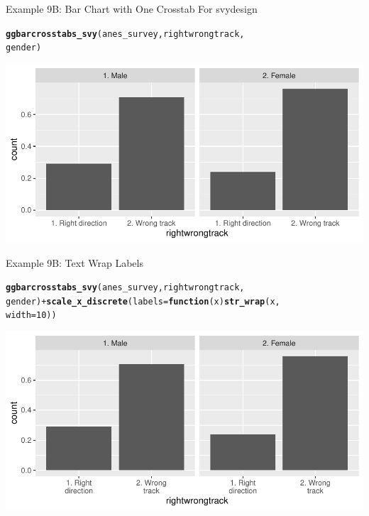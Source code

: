 \documentclass{beamer}\usepackage[]{graphicx}\usepackage[]{color}
\makeatletter
\newcommand{\hlnum}[1]{\textcolor[rgb]{0.686,0.059,0.569}{#1}}%
\newcommand{\hlopt}[1]{\textcolor[rgb]{0,0,0}{#1}}%
\newcommand{\hlstd}[1]{\textcolor[rgb]{0.345,0.345,0.345}{#1}}%
\newcommand{\hlkwa}[1]{\textcolor[rgb]{0.161,0.373,0.58}{\textbf{#1}}}%
\newcommand{\hlkwc}[1]{\textcolor[rgb]{0.333,0.667,0.333}{#1}}%
\newcommand{\hlkwd}[1]{\textcolor[rgb]{0.737,0.353,0.396}{\textbf{#1}}}%
\newenvironment{kframe}{%
 \def\at@end@of@kframe{}%
 \ifinner\ifhmode%
  \def\at@end@of@kframe{\end{minipage}}%
  \begin{minipage}{\columnwidth}%
 \fi\fi%
 \def\FrameCommand##1{\hskip\@totalleftmargin \hskip-\fboxsep
 \colorbox{shadecolor}{##1}\hskip-\fboxsep
     \hskip-\linewidth \hskip-\@totalleftmargin \hskip\columnwidth}%
 \MakeFramed {\advance\hsize-\width
   \@totalleftmargin\z@ \linewidth\hsize
   \@setminipage}}%
 {\par\unskip\endMakeFramed%
 \at@end@of@kframe}
\newenvironment{knitrout}{}{} %
\makeatother
\begin{document}
\begin{frame}[fragile]{Example 9B: Bar Chart with One Crosstab For svydesign}

\begin{knitrout}
\color{fgcolor}\begin{kframe}
\begin{alltt}
\hlkwd{ggbarcrosstabs_svy}\hlstd{(anes_survey, rightwrongtrack,}
    \hlstd{gender)}
\end{alltt}
\end{kframe}
\includegraphics[width=0.95\linewidth]{figure/unnamed-chunk-38-1} 
\end{knitrout}
\end{frame}

\begin{frame}[fragile]{Example 9B: Text Wrap Labels}

\begin{knitrout}
\color{fgcolor}\begin{kframe}
\begin{alltt}
\hlkwd{ggbarcrosstabs_svy}\hlstd{(anes_survey, rightwrongtrack,}
    \hlstd{gender)} \hlopt{+} \hlkwd{scale_x_discrete}\hlstd{(}\hlkwc{labels} \hlstd{=} \hlkwa{function}\hlstd{(}\hlkwc{x}\hlstd{)} \hlkwd{str_wrap}\hlstd{(x,}
    \hlkwc{width} \hlstd{=} \hlnum{10}\hlstd{))}
\end{alltt}
\end{kframe}
\includegraphics[width=0.95\linewidth]{figure/unnamed-chunk-39-1} 
\end{knitrout}
\end{frame}
\end{document}

